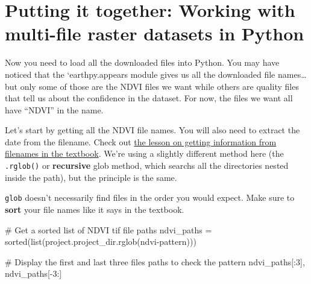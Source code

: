 \documentclass[
  letterpaper,
  DIV=11,
  numbers=noendperiod,
  oneside]{scrreprt}
\newenvironment{Shaded}{\begin{snugshade}}{\end{snugshade}}
\newcommand{\BuiltInTok}[1]{\textcolor[rgb]{0.00,0.23,0.31}{#1}}
\newcommand{\CommentTok}[1]{\textcolor[rgb]{0.37,0.37,0.37}{#1}}
\newcommand{\DecValTok}[1]{\textcolor[rgb]{0.68,0.00,0.00}{#1}}
\newcommand{\NormalTok}[1]{\textcolor[rgb]{0.00,0.23,0.31}{#1}}
\newcommand{\OperatorTok}[1]{\textcolor[rgb]{0.37,0.37,0.37}{#1}}
\newcommand{\StringTok}[1]{\textcolor[rgb]{0.13,0.47,0.30}{#1}}
\begin{document}
\section{Putting it together: Working with multi-file raster datasets in
Python}\label{putting-it-together-working-with-multi-file-raster-datasets-in-python-1}

Now you need to load all the downloaded files into Python. You may have
noticed that the `earthpy.appears module gives us all the downloaded
file names\ldots but only some of those are the NDVI files we want while
others are quality files that tell us about the confidence in the
dataset. For now, the files we want all have ``NDVI'' in the name.

Let's start by getting all the NDVI file names. You will also need to
extract the date from the filename. Check out
\href{https://www.earthdatascience.org/courses/intro-to-earth-data-science/write-efficient-python-code/loops/data-workflows-with-loops/}{the
lesson on getting information from filenames in the textbook}. We're
using a slightly different method here (the \texttt{.rglob()} or
\textbf{recursive} glob method, which searchs all the directories nested
inside the path), but the principle is the same.

\begin{tcolorbox}[enhanced jigsaw, colbacktitle=quarto-callout-caution-color!10!white, opacityback=0, bottomtitle=1mm, toptitle=1mm, bottomrule=.15mm, left=2mm, colframe=quarto-callout-caution-color-frame, leftrule=.75mm, opacitybacktitle=0.6, colback=white, rightrule=.15mm, toprule=.15mm, breakable, titlerule=0mm, title=\textcolor{quarto-callout-caution-color}{\faFire}\hspace{0.5em}{GOTCHA ALERT!}, coltitle=black, arc=.35mm]

\texttt{glob} doesn't necessarily find files in the order you would
expect. Make sure to \textbf{sort} your file names like it says in the
textbook.

\end{tcolorbox}

\begin{Shaded}
\begin{Highlighting}[]
\CommentTok{\# Get a sorted list of NDVI tif file paths}
\NormalTok{ndvi\_paths }\OperatorTok{=} \BuiltInTok{sorted}\NormalTok{(}\BuiltInTok{list}\NormalTok{(project.project\_dir.rglob(}\StringTok{\textquotesingle{}ndvi{-}pattern\textquotesingle{}}\NormalTok{)))}

\CommentTok{\# Display the first and last three files paths to check the pattern}
\NormalTok{ndvi\_paths[:}\DecValTok{3}\NormalTok{], ndvi\_paths[}\OperatorTok{{-}}\DecValTok{3}\NormalTok{:]}
\end{Highlighting}
\end{Shaded}
\end{document}
